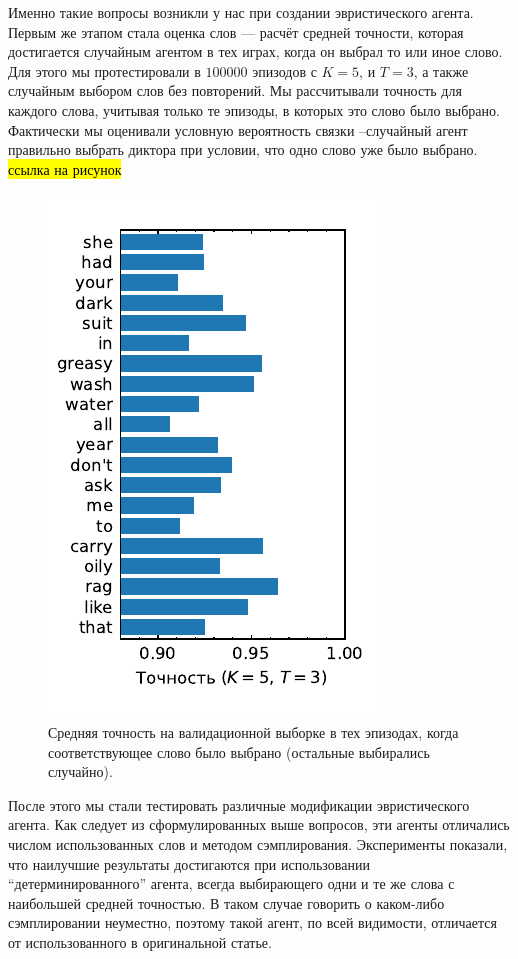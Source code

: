 Именно такие вопросы возникли у нас при создании эвристического агента. Первым
же этапом стала оценка слов --- расчёт средней точности, которая достигается
случайным агентом в тех играх, когда он выбрал то или иное слово. Для этого мы
протестировали \guesser{} в $100000$ эпизодов с $K = 5$, и $T = 3$, а также
случайным выбором слов без повторений. Мы рассчитывали точность для каждого слова,
учитывая только те эпизоды, в которых это слово было выбрано. Фактически мы оценивали
условную вероятность связки \guesser{}--случайный агент правильно выбрать диктора
при условии, что одно слово уже было выбрано. \hl{ссылка на рисунок}

\begin{figure}[!h]
    \centering
    \includegraphics[scale=1.0]{../plots/word_scores.pdf}
    \caption{Средняя точность \guesser{} на валидационной выборке в тех
    эпизодах, когда соответствующее слово было выбрано (остальные выбирались
    случайно).}
\end{figure}

После этого мы стали тестировать различные модификации эвристического агента.
Как следует из сформулированных выше вопросов, эти агенты отличались числом
использованных слов и методом сэмплирования. Эксперименты показали, что
наилучшие результаты достигаются при использовании ``детерминированного'' агента,
всегда выбирающего одни и те же слова с наибольшей средней точностью.
В таком случае говорить о каком-либо сэмплировании неуместно, поэтому такой
агент, по всей видимости, отличается от использованного в оригинальной статье.

